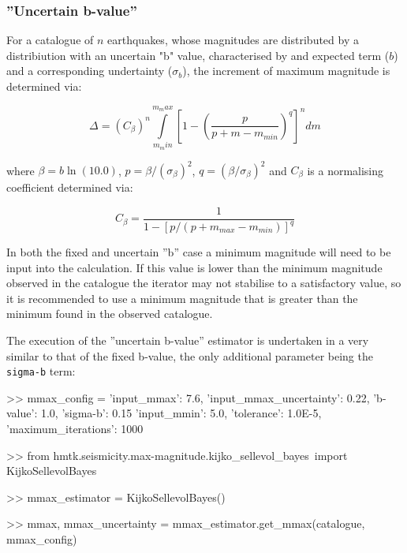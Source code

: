 \subsubsection{''Uncertain b-value''}

For a catalogue of $n$ earthquakes, whose magnitudes are distributed by a \cite{GutenbergRichter1944} distribiution with an uncertain "b" value, characterised by and expected term ($b$) and a corresponding undertainty ($\sigma_b$), the increment of maximum magnitude is determined via:


\begin{equation}
\Delta = \left( {C_{\beta}} \right)^n \int\limits_{m_min}^{m_max} \left[ {1 - \left( {\frac{p}{p + m - m_{min}}} \right) ^q} \right]^n dm
\end{equation}

where $\beta = b \ln \left( {10.0} \right)$, $p = \beta / \left( {\sigma_{\beta}} \right) ^ 2$, $q = \left( {\beta / \sigma_{\beta}} \right) ^ 2$ and $C_{\beta}$ is a normalising coefficient determined via:

\begin{equation}
C_{\beta} = \frac{1}{1 - \left[ {p / \left( {p + m_{max} - m_{min}} \right) } \right]^q}
\end{equation}

In both the fixed and uncertain ''b'' case a minimum magnitude will need to be input into the calculation. If this value is lower than the minimum magnitude observed in the catalogue the iterator may not stabilise to a satisfactory value, so it is recommended to use a minimum magnitude that is greater than the minimum found in the observed catalogue.

The execution of the ''uncertain b-value'' estimator is undertaken in a very similar to that of the fixed b-value, the only additional parameter being the \verb=sigma-b= term:

\begin{python}[frame=single]
>> mmax_config = {'input_mmax': 7.6,
                  'input_mmax_uncertainty': 0.22,
                  'b-value': 1.0,
                  'sigma-b': 0.15
                  'input_mmin': 5.0,
                  'tolerance': 1.0E-5, 
                  'maximum_iterations': 1000}
                       
>> from hmtk.seismicity.max-magnitude.kijko_sellevol_bayes\
    import KijkoSellevolBayes

>> mmax_estimator = KijkoSellevolBayes()

>> mmax, mmax_uncertainty = mmax_estimator.get_mmax(catalogue,
                                                    mmax_config)
\end{python}

